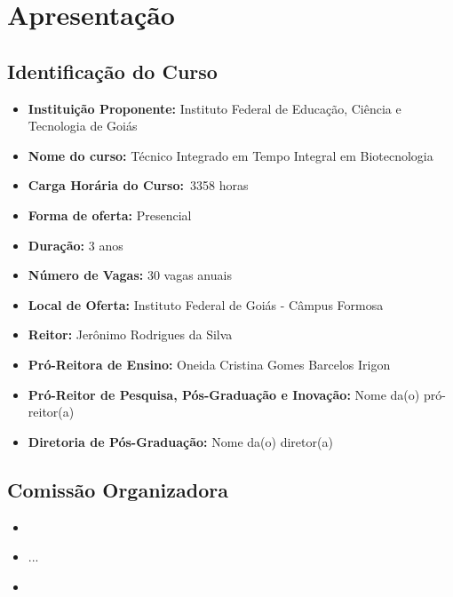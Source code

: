 \documentclass[11pt,fleqn]{book} %
\newcommand{\VER}[1]{\begingroup\color{red}#1\endgroup}
\begin{document}
\renewcommand\contentsname{Sumário}
\tableofcontents

\chapter{Apresentação}
\vspace{6em}
\begin{flushright}
	\textit{ }
\end{flushright}
\vspace{12em}
\indent


\section{Identificação do Curso}
\begin{itemize}
	\item \textbf{Instituição Proponente:} Instituto Federal de Educação, Ciência e Tecnologia de Goiás
	\item \textbf{Nome do curso:} Técnico Integrado em Tempo Integral em Biotecnologia
	\item \textbf{Carga Horária do Curso:}~\VER{3358} horas
	\item \textbf{Forma de oferta:} Presencial
	\item \textbf{Duração:} 3 anos
	\item \textbf{Número de Vagas:} 30 vagas anuais
	\item \textbf{Local de Oferta:} Instituto Federal de Goiás - Câmpus Formosa
	\item \textbf{Reitor:} Jerônimo Rodrigues da Silva
	\item \textbf{Pró-Reitora de Ensino:} Oneida Cristina Gomes Barcelos Irigon
	\item \textbf{Pró-Reitor de Pesquisa, Pós-Graduação e Inovação:} \VER{Nome da(o) pró-reitor(a)}
	\item \textbf{Diretoria de Pós-Graduação:} \VER{Nome da(o) diretor(a)}
\end{itemize}

\newpage  
\section{Comissão Organizadora}
	\begin{itemize}[label=\bfseries]
		\item {}
		\item ...
		\item {}
	\end{itemize}
\end{document}

